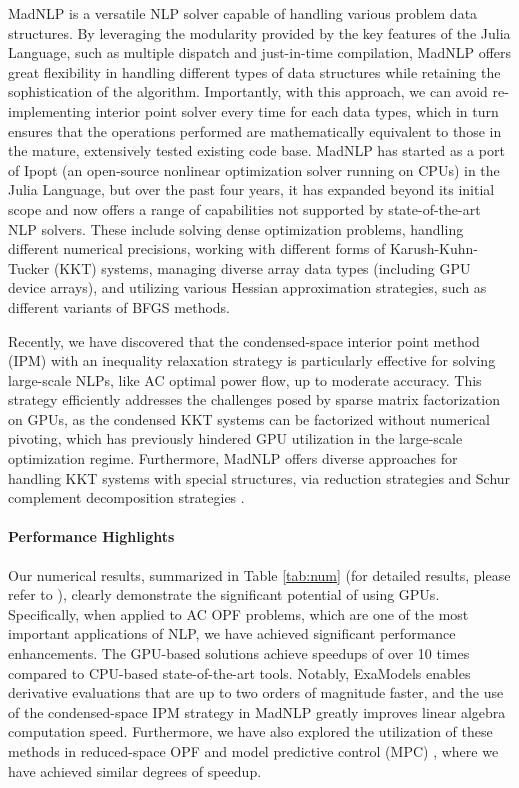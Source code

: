 MadNLP is a versatile NLP solver capable of
handling various problem data structures. By leveraging the modularity
provided by the key features of the Julia Language, such as multiple
dispatch and just-in-time compilation, MadNLP offers great flexibility
in handling different types of data structures while retaining the
sophistication of the algorithm. Importantly, with this approach, we can avoid
re-implementing interior point solver every time for each data types,
which in turn ensures that the operations performed are mathematically
equivalent to those in the mature, extensively tested existing code
base. MadNLP has started as a port of Ipopt (an open-source nonlinear
optimization solver running on CPUs) in the Julia Language, but over
the past four years, it has expanded beyond its initial scope and now
offers a range of capabilities not supported by state-of-the-art NLP
solvers. These include solving dense optimization problems, handling
different numerical precisions, working with different forms of Karush-Kuhn-Tucker (KKT)
systems, managing diverse array data types (including GPU device
arrays), and utilizing various Hessian approximation strategies, such
as different variants of BFGS methods.

Recently, we have discovered that the condensed-space interior point
method (IPM) with an inequality relaxation strategy is particularly
effective for solving large-scale NLPs, like AC optimal power flow, up
to moderate accuracy. This strategy efficiently addresses the
challenges posed by sparse matrix factorization on GPUs, as the
condensed KKT systems can be factorized without numerical pivoting,
which has previously hindered GPU utilization in the large-scale
optimization regime.  Furthermore, MadNLP offers diverse approaches
for handling KKT systems with special structures, via reduction
strategies \cite{pacaud2023accelerating} and Schur complement decomposition
strategies \cite{pacaud2023parallel}.



\paragraph{Performance Highlights}

Our numerical results, summarized in Table \ref{tab:num} (for detailed
results, please refer to \cite{shin2023accelerating}), clearly
demonstrate the significant potential of using GPUs. Specifically,
when applied to AC OPF problems, which are one of the most important
applications of NLP, we have achieved significant performance
enhancements. The GPU-based solutions achieve speedups of over 10
times compared to CPU-based state-of-the-art tools. Notably, ExaModels
enables derivative evaluations that are up to two orders of magnitude
faster, and the use of the condensed-space IPM strategy in MadNLP
greatly improves linear algebra computation speed. Furthermore, we
have also explored the utilization of these methods in reduced-space
OPF \cite{pacaud2023accelerating} and model predictive control (MPC)
\cite{cole2023exploiting}, where we have achieved similar degrees of
speedup.


